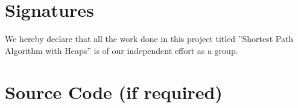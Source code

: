 \documentclass[twoside]{article}
\begin{document}
\begin{CJK*}{UTF8}{gbsn}
\section{Signatures}

We hereby declare that all the work done in this project titled ”Shortest Path Algorithm with Heaps” is of our independent effort as a group.


\vskip 1.5in
\newpage


%



\appendix 
\section{Source Code (if required)}
    
    
    

\end{CJK*}
\end{document}
